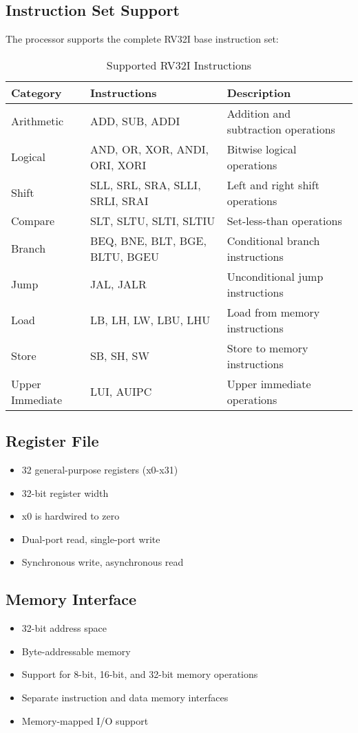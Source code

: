 \documentclass[11pt,a4paper]{article}
\begin{document}
\subsection{Instruction Set Support}
The processor supports the complete RV32I base instruction set:

\begin{table}[h]
\centering
\begin{tabularx}{\textwidth}{|l|l|X|}
\hline
\textbf{Category} & \textbf{Instructions} & \textbf{Description} \\
\hline
Arithmetic & ADD, SUB, ADDI & Addition and subtraction operations \\
\hline
Logical & AND, OR, XOR, ANDI, ORI, XORI & Bitwise logical operations \\
\hline
Shift & SLL, SRL, SRA, SLLI, SRLI, SRAI & Left and right shift operations \\
\hline
Compare & SLT, SLTU, SLTI, SLTIU & Set-less-than operations \\
\hline
Branch & BEQ, BNE, BLT, BGE, BLTU, BGEU & Conditional branch instructions \\
\hline
Jump & JAL, JALR & Unconditional jump instructions \\
\hline
Load & LB, LH, LW, LBU, LHU & Load from memory instructions \\
\hline
Store & SB, SH, SW & Store to memory instructions \\
\hline
Upper Immediate & LUI, AUIPC & Upper immediate operations \\
\hline
\end{tabularx}
\caption{Supported RV32I Instructions}
\end{table}

\subsection{Register File}
\begin{itemize}
    \item 32 general-purpose registers (x0-x31)
    \item 32-bit register width
    \item x0 is hardwired to zero
    \item Dual-port read, single-port write
    \item Synchronous write, asynchronous read
\end{itemize}

\subsection{Memory Interface}
\begin{itemize}
    \item 32-bit address space
    \item Byte-addressable memory
    \item Support for 8-bit, 16-bit, and 32-bit memory operations
    \item Separate instruction and data memory interfaces
    \item Memory-mapped I/O support
\end{itemize}
\end{document}
